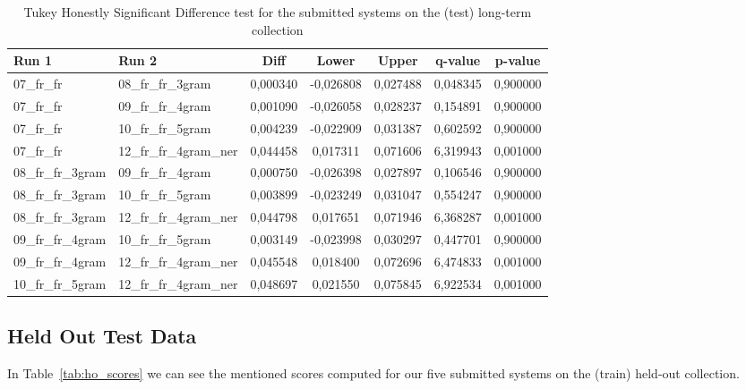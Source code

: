 \begin{table}[h!]
    \centering
    \caption{Tukey Honestly Significant Difference test for the submitted systems on the (test) long-term collection}
    \label{tab:lt_comparison}
    \begin{tabular}{|l|l||c|c|c|c|c|}
        \hline
        \textbf{Run 1} & \textbf{Run 2} & \textbf{Diff} & \textbf{Lower} & \textbf{Upper} & \textbf{q-value} & \textbf{p-value} \\ \hline
        07\_fr\_fr & 08\_fr\_fr\_3gram & 0,000340 & -0,026808 & 0,027488 & 0,048345 & 0,900000 \\ \hline
        07\_fr\_fr & 09\_fr\_fr\_4gram & 0,001090 & -0,026058 & 0,028237 & 0,154891 & 0,900000 \\ \hline
        07\_fr\_fr & 10\_fr\_fr\_5gram & 0,004239 & -0,022909 & 0,031387 & 0,602592 & 0,900000 \\ \hline
        07\_fr\_fr & 12\_fr\_fr\_4gram\_ner & 0,044458 & 0,017311 & 0,071606 & 6,319943 & 0,001000 \\ \hline
        08\_fr\_fr\_3gram & 09\_fr\_fr\_4gram & 0,000750 & -0,026398 & 0,027897 & 0,106546 & 0,900000 \\ \hline
        08\_fr\_fr\_3gram & 10\_fr\_fr\_5gram & 0,003899 & -0,023249 & 0,031047 & 0,554247 & 0,900000 \\ \hline
        08\_fr\_fr\_3gram & 12\_fr\_fr\_4gram\_ner & 0,044798 & 0,017651 & 0,071946 & 6,368287 & 0,001000 \\ \hline
        09\_fr\_fr\_4gram & 10\_fr\_fr\_5gram & 0,003149 & -0,023998 & 0,030297 & 0,447701 & 0,900000 \\ \hline
        09\_fr\_fr\_4gram & 12\_fr\_fr\_4gram\_ner & 0,045548 & 0,018400 & 0,072696 & 6,474833 & 0,001000 \\ \hline
        10\_fr\_fr\_5gram & 12\_fr\_fr\_4gram\_ner & 0,048697 & 0,021550 & 0,075845 & 6,922534 & 0,001000 \\ \hline
    \end{tabular}
\end{table}

\subsection{Held Out Test Data}\label{subsec:held_out}

In Table~\ref{tab:ho_scores} we can see the mentioned scores computed for our five submitted systems on the (train)
held-out collection.\\


